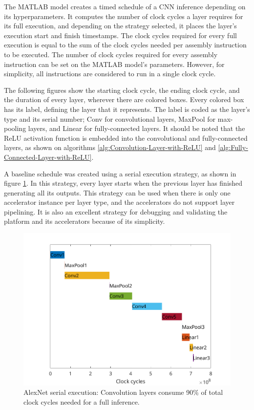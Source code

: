 The MATLAB model creates a timed schedule of a CNN inference depending on its hyperparameters. It computes the number of clock cycles a layer requires for its full execution, and depending on the strategy selected, it places the layer's execution start and finish timestamps. The clock cycles required for every full execution is equal to the sum of the clock cycles needed per assembly instruction to be executed. The number of clock cycles required for every assembly instruction can be set on the MATLAB model's parameters. However, for simplicity, all instructions are considered to run in a single clock cycle.

The following figures show the starting clock cycle, the ending clock cycle, and the duration of every layer, wherever there are colored boxes. Every colored box has its label, defining the layer that it represents. The label is coded as the layer's type and its serial number; Conv for convolutional layers, MaxPool for max-pooling layers, and Linear for fully-connected layers. It should be noted that the ReLU activation function is embedded into the convolutional and fully-connected layers, as shown on algorithms \ref{alg:Convolution-Layer-with-ReLU} and \ref{alg:Fully-Connected-Layer-with-ReLU}.

A baseline schedule was created using a serial execution strategy, as shown in figure \ref{fig:serial-execution}. In this strategy, every layer starts when the previous layer has finished generating all its outputs. This strategy can be used when there is only one accelerator instance per layer type, and the accelerators do not support layer pipelining. It is also an excellent strategy for debugging and validating the platform and its accelerators because of its simplicity.

\begin{figure} [H]
	\centering
	\includegraphics[width=\textwidth]{Images/Scheduling/Serial.png}
	\decoRule
	\caption[AlexNet serial execution]{AlexNet serial execution: Convolution layers consume 90\% of total clock cycles needed for a full inference.}
	\label{fig:serial-execution}
\end{figure}

